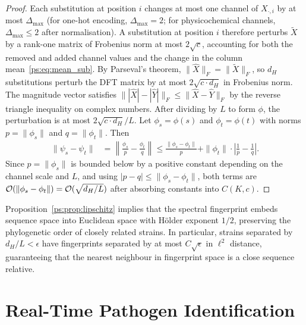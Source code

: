 \begin{proof}
Each substitution at position $i$ changes at most one channel of $X_{\cdot,i}$
by at most $\Delta_{\max}$ (for one-hot encoding, $\Delta_{\max} = 2$; for
physicochemical channels, $\Delta_{\max} \leq 2$ after normalisation). A
substitution at position $i$ therefore perturbs $\widetilde{X}$ by a rank-one
matrix of Frobenius norm at most $2\sqrt{c}$, accounting for both the removed
and added channel values and the change in the column mean~\eqref{ps:eq:mean_sub}.
By Parseval's theorem, $\|\widehat{X}\|_F = \|\widetilde{X}\|_F$, so $d_H$
substitutions perturb the DFT matrix by at most $2\sqrt{c \cdot d_H}$ in
Frobenius norm. The magnitude vector satisfies
$\||\widehat{X}| - |\widehat{Y}|\|_F \leq \|\widehat{X} - \widehat{Y}\|_F$
by the reverse triangle inequality on complex numbers. After dividing by $L$ to
form $\phi$, the perturbation is at most $2\sqrt{c \cdot d_H}/L$. Let
$\phi_s = \phi(s)$ and $\phi_t = \phi(t)$ with norms $p = \|\phi_s\|$ and
$q = \|\phi_t\|$. Then
\begin{align}
  \|\psi_s - \psi_t\| &= \left\|\frac{\phi_s}{p} - \frac{\phi_t}{q}\right\|
  \leq \frac{\|\phi_s - \phi_t\|}{p} + \|\phi_t\|\cdot\left|\frac{1}{p} -
  \frac{1}{q}\right|.
\end{align}
Since $p = \|\phi_s\|$ is bounded below by a positive constant depending on the
channel scale and $L$, and using $|p - q| \leq \|\phi_s - \phi_t\|$, both
terms are $\mathcal{O}(\|\phi_s - \phi_t\|) = \mathcal{O}(\sqrt{d_H/L})$ after absorbing
constants into $C(K, c)$.
\end{proof}

\begin{remark}
Proposition~\ref{ps:prop:lipschitz} implies that the spectral fingerprint embeds
sequence space into Euclidean space with H\"{o}lder exponent $1/2$, preserving
the phylogenetic order of closely related strains. In particular, strains
separated by $d_H/L < \epsilon$ have fingerprints separated by at most
$C\sqrt{\epsilon}$ in $\ell^2$ distance, guaranteeing that the nearest neighbour
in fingerprint space is a close sequence relative.
\end{remark}

\section{Real-Time Pathogen Identification}
\label{ps:sec:identification}

